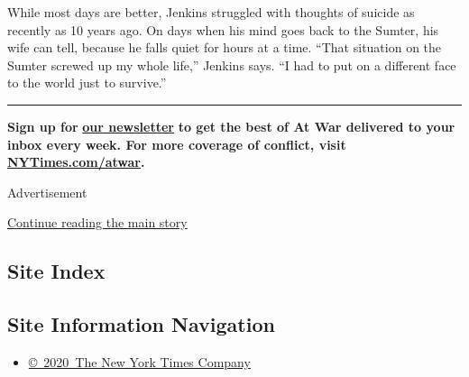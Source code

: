 While most days are better, Jenkins struggled with thoughts of suicide
as recently as 10 years ago. On days when his mind goes back to the
Sumter, his wife can tell, because he falls quiet for hours at a time.
``That situation on the Sumter screwed up my whole life,'' Jenkins says.
``I had to put on a different face to the world just to survive.''

\begin{center}\rule{0.5\linewidth}{\linethickness}\end{center}

\textbf{Sign up for}
\textbf{\href{https://www.nytimes3xbfgragh.onion/newsletters/at-war}{our
newsletter}} \textbf{to get the best of At War delivered to your inbox
every week. For more coverage of conflict, visit}
\textbf{\href{https://www.nytimes3xbfgragh.onion/spotlight/atwar}{NYTimes.com/atwar}.}

Advertisement

\protect\hyperlink{after-bottom}{Continue reading the main story}

\hypertarget{site-index}{%
\subsection{Site Index}\label{site-index}}

\hypertarget{site-information-navigation}{%
\subsection{Site Information
Navigation}\label{site-information-navigation}}

\begin{itemize}
\tightlist
\item
  \href{https://help.nytimes3xbfgragh.onion/hc/en-us/articles/115014792127-Copyright-notice}{©~2020~The
  New York Times Company}
\end{itemize}

